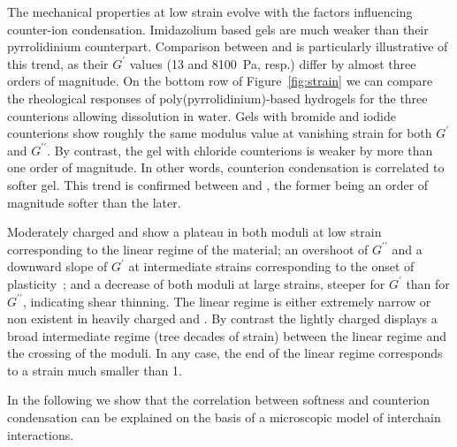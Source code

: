 \documentclass[journal=jacsat,manuscript=article]{achemso}
\begin{document}
The mechanical properties at low strain evolve with the factors influencing counter-ion condensation. Imidazolium based gels are much weaker than their pyrrolidinium counterpart. Comparison between  and  is particularly illustrative of this trend, as their $G^\prime$ values (13 and \SI{8100}{\pascal}, resp.) differ by almost three orders of magnitude. On the bottom row of Figure~\ref{fig:strain} we can compare the rheological responses of poly(pyrrolidinium)-based hydrogels for the three counterions allowing dissolution in water. Gels with bromide and iodide counterions show roughly the same modulus value at vanishing strain for both $G^\prime$ and $G^{\prime\prime}$. By contrast, the gel with chloride counterions is weaker by more than one order of magnitude. In other words, counterion condensation is correlated to softer gel. This trend is confirmed between  and , the former being an order of magnitude softer than the later.

Moderately charged  and  show a plateau in both moduli at low strain corresponding to the linear regime of the material; an overshoot of $G^{\prime\prime}$ and a downward slope of $G^\prime$ at intermediate strains corresponding to the onset of plasticity~\cite{Hyun2011}; and a decrease of both moduli at large strains, steeper for $G^\prime$ than for $G^{\prime\prime}$, indicating shear thinning. The linear regime is either extremely narrow or non existent in heavily charged  and . By contrast the lightly charged  displays a broad intermediate regime (tree decades of strain) between the linear regime and the crossing of the moduli. In any case, the end of the linear regime corresponds to a strain much smaller than 1.

In the following we show that the correlation between softness and counterion condensation can be explained on the basis of a microscopic model of interchain interactions.




\end{document}
